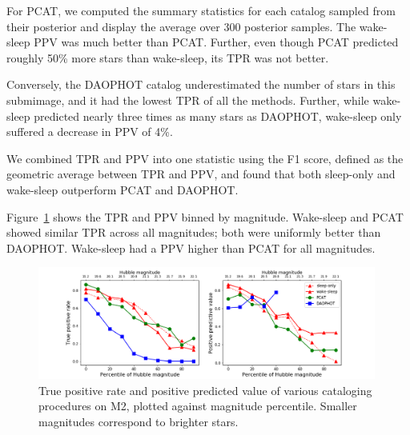 For PCAT, we computed the summary statistics for each catalog sampled from their posterior and display the average over 300 posterior samples. 
The wake-sleep PPV was much better than PCAT. 
Further, even though PCAT predicted roughly 50\% more stars than 
wake-sleep, its TPR was not better.






Conversely, the DAOPHOT catalog underestimated the number of stars in this submimage, and it had the lowest TPR of all the methods.
Further, while wake-sleep predicted nearly three times as many stars as DAOPHOT, wake-sleep only suffered a decrease in PPV of 4\%. 

We combined TPR and PPV into one statistic using the F1 score,
defined as the geometric average between TPR and PPV, and found that both sleep-only and wake-sleep outperform PCAT and DAOPHOT.



Figure~\ref{fig:summary_stats} shows the TPR and PPV binned by magnitude.
Wake-sleep and PCAT showed similar TPR across all magnitudes; both were
uniformly better than DAOPHOT. Wake-sleep had a PPV higher than PCAT for all magnitudes. 

\begin{figure}[ht]
    \centering
    \includegraphics[width=0.99\textwidth]{figures/summary_statistics_m2.png}
    \caption{True positive rate and positive predicted value of various cataloging
    procedures on M2, plotted against magnitude percentile.
    Smaller magnitudes correspond to brighter stars. }
    \label{fig:summary_stats}
\end{figure}


